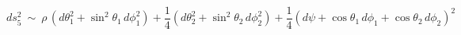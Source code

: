 \begin{equation} 
\label{metinf}
ds^2_5 ~ \sim~ \rho\, (d\theta_1^2 + \sin ^2\theta_1\, d\phi_1^2) +
\frac{1}{4}  (d\theta_2^2+\sin^2\theta_2\, d\phi_2^2) + \frac{1}{4}
(d\psi + \cos\theta_1\, d\phi_1 + \cos\theta_2 \, d\phi_2)^2
\end{equation} 
